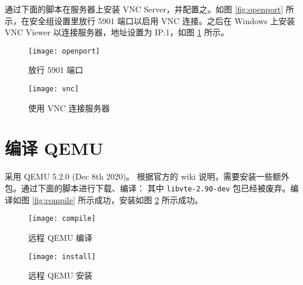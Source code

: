     通过下面的脚本在服务器上安装 VNC Server，并配置之\cite{vncconnect}。如图 \ref{fig:openport} 所示，在安全组设置里放行 5901 端口以启用 VNC 连接。之后在 Windows 上安装 VNC Viewer 以连接服务器，地址设置为 IP:1，如图 \ref{fig:vnc} 所示。




    \begin{figure}[H]
        \centering
        \begin{minipage}{0.48\textwidth}
            \centering
            \texttt{[image: openport]}
            \caption{放行 5901 端口}\label{fig:openport}
        \end{minipage}
        \begin{minipage}{0.48\textwidth}
            \centering
            \texttt{[image: vnc]}
            \caption{使用 VNC 连接服务器}\label{fig:vnc}
        \end{minipage}
    \end{figure}

    \section{编译 QEMU}
    采用 QEMU 5.2.0 (Dec 8th 2020)。
    根据官方的 wiki 说明\cite{installwiki}，需要安装一些额外包。通过下面的脚本进行下载、编译：
    其中 \verb"libvte-2.90-dev" 包已经被废弃。编译如图 \ref{fig:compile} 所示成功，安装如图 \ref{fig:install} 所示成功。
    \begin{figure}[h]
        \centering
        \begin{minipage}{0.48\textwidth}
            \centering
            \texttt{[image: compile]}
            \caption{远程 QEMU 编译}\label{fig:compile}
        \end{minipage}
        \begin{minipage}{0.48\textwidth}
            \texttt{[image: install]}
            \caption{远程 QEMU 安装}\label{fig:install}
        \end{minipage}
    \end{figure}


